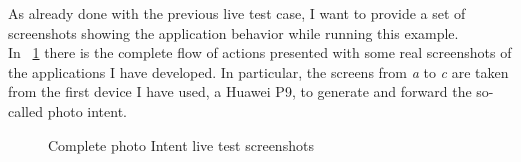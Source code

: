 As already done with the previous live test case, I want to provide a set of screenshots showing the application behavior while running this example.\\
In \figurename~\ref{fig:5.9} there is the complete flow of actions presented with some real screenshots of the applications I have developed. In particular, the screens from \textit{a} to \textit{c} are taken from the first device I have used, a Huawei P9, to generate and forward the so-called photo intent.\\
\begin{figure}[h!]
	\centering
	\begin{minipage}{.24\textwidth}\centering
	\end{minipage}
	\begin{minipage}{.24\textwidth}\centering
	\end{minipage}
	\centering
	\begin{minipage}{.24\textwidth}\centering
	\end{minipage}
	\begin{minipage}{.24\textwidth}\centering
	\end{minipage}
	\label{fig:5.9}
\end{figure}
\begin{figure}[h!]
	\ContinuedFloat
	\centering
	\begin{minipage}{.24\textwidth}\centering
		\bigskip
	\end{minipage}
	\begin{minipage}{.24\textwidth}\centering
		\bigskip
	\end{minipage}
	\begin{minipage}{.24\textwidth}\centering
		\bigskip
	\end{minipage}
	\begin{minipage}{.24\textwidth}\centering
		\bigskip
	\end{minipage}
	\caption{Complete photo Intent live test screenshots}
	
\end{figure}\\
